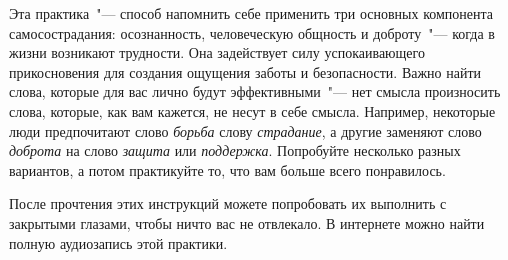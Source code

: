 \newpage
{}\label{IP:Self-Compassion_Break}

Эта практика~"--- способ напомнить себе применить три основных компонента самосострадания: осознанность, человеческую общность и доброту~"--- когда в жизни возникают трудности. Она задействует силу успокаивающего прикосновения для создания ощущения заботы и безопасности. Важно найти слова, которые для вас лично будут эффективными~"--- нет смысла произносить слова, которые, как вам кажется, не несут в себе смысла. Например, некоторые люди предпочитают слово \textit{борьба} слову \textit{страдание}, а другие заменяют слово \textit{доброта} на слово \textit{защита} или \textit{поддержка}. Попробуйте несколько разных вариантов, а потом практикуйте то, что вам больше всего понравилось. 

После прочтения этих инструкций можете попробовать их выполнить с закрытыми глазами, чтобы ничто вас не отвлекало. В интернете можно найти полную аудиозапись этой практики.

